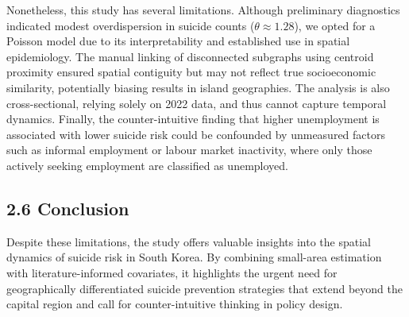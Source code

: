 \documentclass[11pt]{article}
\begin{document}
	Nonetheless, this study has several limitations. Although preliminary diagnostics indicated modest overdispersion in suicide counts ($\theta \approx 1.28$), we opted for a Poisson model due to its interpretability and established use in spatial epidemiology. The manual linking of disconnected subgraphs using centroid proximity ensured spatial contiguity but may not reflect true socioeconomic similarity, potentially biasing results in island geographies. The analysis is also cross-sectional, relying solely on 2022 data, and thus cannot capture temporal dynamics. Finally, the counter-intuitive finding that higher unemployment is associated with lower suicide risk could be confounded by unmeasured factors such as informal employment or labour market inactivity, where only those actively seeking employment are classified as unemployed.
	
	\subsection*{2.6 Conclusion}
	
	Despite these limitations, the study offers valuable insights into the spatial dynamics of suicide risk in South Korea. By combining small-area estimation with literature-informed covariates, it highlights the urgent need for geographically differentiated suicide prevention strategies that extend beyond the capital region and call for counter-intuitive thinking in policy design.
	
%	
%			
%			
%			
%			

	
\end{document}
